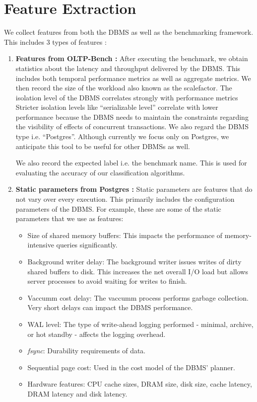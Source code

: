 \section{Feature Extraction} \label{sec:features}

We collect features from both the DBMS as well as the benchmarking framework. 
This includes 3 types of features :

\begin{enumerate}
  \item{\textbf{Features from OLTP-Bench :}
  After executing the benchmark, we obtain statistics about the latency and
  throughput delivered by the DBMS.
  This includes both temporal performance metrics as well as aggregate metrics. 
  We then record the size of the workload also known as the scalefactor.
  The isolation level of the DBMS correlates strongly with performance metrics
  Stricter isolation levels like ``serializable level'' correlate with lower
  performance because the DBMS needs to maintain the constraints regarding
  the visibility of effects of concurrent transactions. We also regard the
  DBMS type i.e. ``Postgres''. Although currently we focus only on Postgres, 
  we anticipate this tool to be useful for other DBMSs as well. 
  
  We also record the expected label i.e. the benchmark name. This is used for
  evaluating the accuracy of our classification algorithms.  
  }
  
  \item {\textbf{Static parameters from Postgres :}
  Static parameters are features that do not vary over every execution. This
  primarily includes the configuration parameters of the DBMS. For example,
  these are some of the static parameters that we use as features:\\
   
  \begin{itemize}
    \item {Size of shared memory buffers: This impacts the performance of
    memory-intensive queries significantly.}
    \item {Background writer delay: The background writer issues writes of
    dirty shared buffers to disk. This increases the net overall I/O load but
    allows server processes to avoid waiting for writes to finish.}
    \item {Vaccumm cost delay: The vaccumm process performs garbage 
    collection. Very short delays can impact the DBMS performance.}
    \item {WAL level: The type of write-ahead logging performed - minimal,
    archive, or hot standby - affects the logging overhead.}
    \item {\textit{fsync}: Durability requirements of data.}
    \item {Sequential page cost: Used in the cost model of the DBMS' planner.}
	\item {Hardware features: CPU cache sizes, DRAM size, disk size, cache latency,
	DRAM latency and disk latency.}
  \end{itemize}
  
}
\end{enumerate}
